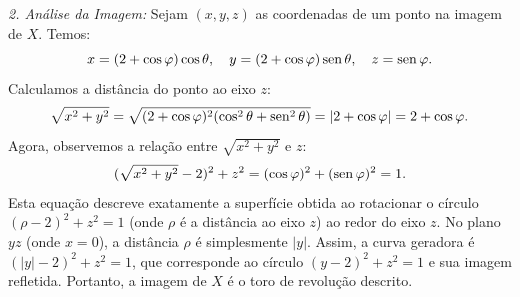 {	\textit{2. Análise da Imagem:}
	Sejam $(x,y,z)$ as coordenadas de um ponto na imagem de $X$. Temos:
	\begin{equation*}
		x = (2 + \cos \varphi) \cos \theta, \quad y = (2 + \cos \varphi) \operatorname{sen} \theta, \quad z = \operatorname{sen} \varphi.
	\end{equation*}
	Calculamos a distância do ponto ao eixo $z$:
	\begin{equation*}
		\sqrt{x^2 + y^2} = \sqrt{(2 + \cos \varphi)^2 (\cos^2 \theta + \operatorname{sen}^2 \theta)} = |2 + \cos \varphi| = 2 + \cos \varphi.
	\end{equation*}
	Agora, observemos a relação entre $\sqrt{x^2+y^2}$ e $z$:
	\begin{equation*}
		(\sqrt{x^2+y^2} - 2)^2 + z^2 = (\cos \varphi)^2 + (\operatorname{sen} \varphi)^2 = 1.
	\end{equation*}
	Esta equação descreve exatamente a superfície obtida ao rotacionar o círculo $(\rho - 2)^2 + z^2 = 1$ (onde $\rho$ é a distância ao eixo $z$) ao redor do eixo $z$. No plano $yz$ (onde $x=0$), a distância $\rho$ é simplesmente $|y|$. Assim, a curva geradora é $(|y|-2)^2 + z^2 = 1$, que corresponde ao círculo $(y-2)^2 + z^2 = 1$ e sua imagem refletida. Portanto, a imagem de $X$ é o toro de revolução descrito.
}


